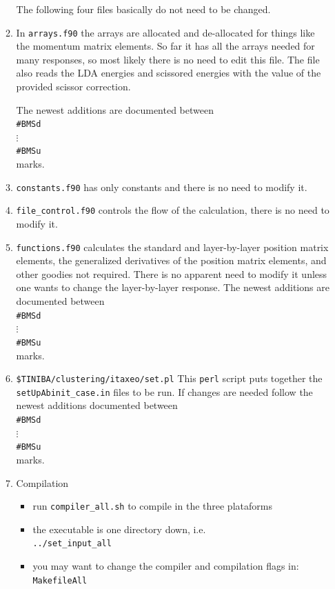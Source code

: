 \documentclass[12pt]{article}
\numberwithin{equation}{section}
\begin{document}
\begin{itemize}
\begin{enumerate}
The following four files basically do not need to be changed.
\item In \verb=arrays.f90= the arrays are allocated and de-allocated
  for things like the momentum matrix elements. So far it has all the
  arrays needed for many responses, so most likely there is no need to
  edit this file. The file also reads the LDA energies and scissored
  energies with the value of the provided scissor correction.

The newest additions are documented between\\
\verb=#BMSd=\\
$\vdots$\\
\verb=#BMSu=\\
marks.

\item \verb=constants.f90= has only constants and there is no need to
modify it.
\item \verb=file_control.f90= controls the flow of the calculation,
there is no need to
modify it.
\item \verb=functions.f90= calculates the standard and  layer-by-layer position
  matrix elements, the generalized derivatives of the position matrix
  elements, and other goodies not required. 
There is no apparent need to
modify it unless one wants to change the layer-by-layer response.
The newest additions are documented between\\
\verb=#BMSd=\\
$\vdots$\\
\verb=#BMSu=\\
marks.

\item \verb=$TINIBA/clustering/itaxeo/set.pl= This \verb=perl= script puts together the
  \verb=setUpAbinit_case.in= files to be run. If changes are needed follow the
newest additions documented between\\
\verb=#BMSd=\\
$\vdots$\\
\verb=#BMSu=\\
marks.

\item Compilation
\begin{itemize}
\item run \verb=compiler_all.sh= to compile in the three plataforms
\item the executable is one directory down, i.e.\\
\verb=../set_input_all=
\item you may want to change the compiler and compilation flags in:\\
\verb=MakefileAll=
\end{itemize}


\end{enumerate}
\end{itemize}
\end{document}
